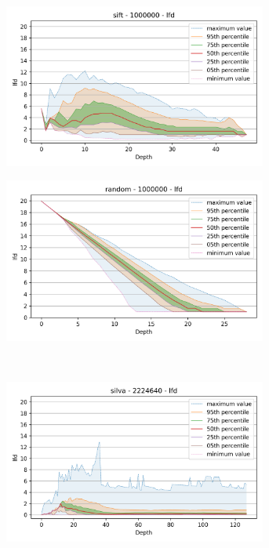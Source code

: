 \begin{figure}
\vspace{1em}
\\
\begin{subfigure}[b]{0.47\textwidth}
\includegraphics[width=0.95\textwidth]{images/lfd_plots/sift-1000000-lfd.png}\\
\label{fig:results:sift-lfd}
\end{subfigure}%
\begin{subfigure}[b]{0.47\textwidth}
\includegraphics[width=0.95\textwidth]{images/lfd_plots/random-1000000-lfd.png}\\
\label{fig:results:random-lfd}
\end{subfigure}
\vspace{1em}
\\
\begin{subfigure}[b]{0.47\textwidth}
\includegraphics[width=0.95\textwidth]{images/lfd_plots/silva-2224640-lfd.png}\\

\end{subfigure}
\end{figure}
